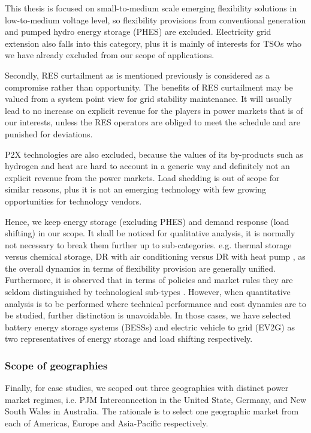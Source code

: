 This thesis is focused on small-to-medium scale emerging flexibility solutions in low-to-medium voltage level, so flexibility provisions from conventional generation and pumped hydro energy storage (PHES) are excluded. Electricity grid extension also falls into this category, plus it is mainly of interests for TSOs who we have already excluded from our scope of applications.

Secondly, RES curtailment as is mentioned previously is considered as a compromise rather than opportunity. The benefits of RES curtailment may be valued from a system point view for grid stability maintenance. It will usually lead to no increase on explicit revenue for the players in power markets that is of our interests, unless the RES operators are obliged to meet the schedule and are punished for deviations.

P2X technologies are also excluded, because the values of its by-products such as hydrogen and heat are hard to account in a generic way and definitely not an explicit revenue from the power markets. Load shedding is out of scope for similar reasons, plus it is not an emerging technology with few growing opportunities for technology vendors.

Hence, we keep energy storage (excluding PHES) and demand response (load shifting) in our scope. It shall be noticed for qualitative analysis, it is normally not necessary to break them further up to sub-categories. e.g. thermal storage versus chemical storage, DR with air conditioning versus DR with heat pump , as the overall dynamics in terms of flexibility provision are generally unified. Furthermore, it is observed that in terms of policies and market rules they are seldom distinguished by technological sub-types \cite{FERC784,FERC841,PJMInterconnection2017}. However, when quantitative analysis is to be performed where technical performance and cost dynamics are to be studied, further distinction is unavoidable. In those cases, we have selected battery energy storage systems (BESSs) and electric vehicle to grid (EV2G) as two representatives of energy storage and load shifting respectively. 

\subsubsection{Scope of geographies}

Finally, for case studies, we scoped out three geographies with distinct power market regimes, i.e. PJM Interconnection in the United State, Germany, and New South Wales in Australia. The rationale is to select one geographic market from each of Americas, Europe and Asia-Pacific respectively.


